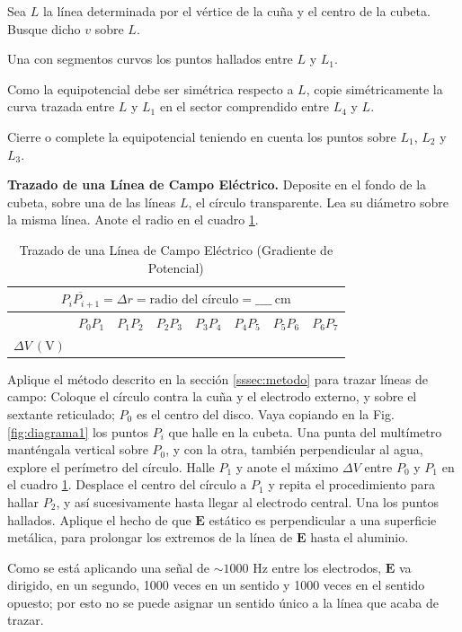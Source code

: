 Sea $L$ la línea determinada por el vértice de la cuña y el centro de la cubeta. Busque dicho $v$ sobre $L$.

Una con segmentos curvos los puntos hallados entre $L$ y $L_1$.

Como la equipotencial debe ser simétrica respecto a $L$, copie simétricamente la curva trazada entre $L$ y $L_1$ en el sector comprendido entre $L_4$ y $L$.

Cierre o complete la equipotencial teniendo en cuenta los puntos sobre $L_1$, $L_2$ y $L_3$.

\bigskip\textbf{Trazado de una Línea de Campo Eléctrico.} Deposite en el fondo de la cubeta, sobre una de las líneas $L$, el círculo transparente. Lea su diámetro sobre la misma línea. Anote el radio en el cuadro \ref{tab:campo_electrico}.

\begin{table}[H]
\centering
\caption{Trazado de una Línea de Campo Eléctrico (Gradiente de Potencial)}
\label{tab:campo_electrico}
\begin{tabular}{|c|c|c|c|c|c|c|c|}
\hline
\multicolumn{8}{|c|}{$\overline{P_i P_{i+1}} = \Delta r = \text{radio del círculo} = \_\_\_\_\ \text{cm}$} \\ \hline
 & $P_0P_1$ & $P_1P_2$ & $P_2P_3$ & $P_3P_4$ & $P_4P_5$ & $P_5P_6$ & $P_6P_7$ \\ \hline
$\Delta V\ (\text{V})$ &  &  &  &  &  &  &  \\ \hline
\end{tabular}
\end{table}

Aplique el método descrito en la sección \ref{sssec:metodo} para trazar líneas de campo: Coloque el círculo contra la cuña y el electrodo externo, y sobre el sextante reticulado; $P_0$ es el centro del disco. Vaya copiando en la Fig. \ref{fig:diagrama1} los puntos $P_i$ que halle en la cubeta. Una punta del multímetro manténgala vertical sobre $P_0$, y con la otra, también perpendicular al agua, explore el perímetro del círculo. Halle $P_1$ y anote el máximo $\Delta V$ entre $P_0$ y $P_1$ en el cuadro \ref{tab:campo_electrico}. Desplace el centro del círculo a $P_1$ y repita el procedimiento para hallar $P_2$, y así sucesivamente hasta llegar al electrodo central. Una los puntos hallados. Aplique el hecho de que $\mathbf{E}$ estático es perpendicular a una superficie metálica, para prolongar los extremos de la línea de $\mathbf{E}$ hasta el aluminio.

Como se está aplicando una señal de $\sim 1000$ Hz entre los electrodos, $\mathbf{E}$ va dirigido, en un segundo, 1000 veces en un sentido y 1000 veces en el sentido opuesto; por esto no se puede asignar un sentido único a la línea que acaba de trazar.

